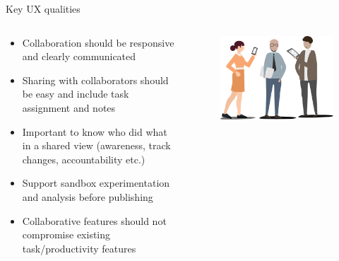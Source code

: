 \documentclass[aspectratio=169]{beamer}
\begin{document}
\begin{frame}{Key UX qualities}
    \begin{columns}
        \begin{column}{0.7\textwidth}
            \small
            \begin{itemize}
                \item Collaboration should be responsive and clearly communicated
                \item Sharing with collaborators should be easy and include task assignment and notes
                \item Important to know who did what in a shared view (awareness, track changes, accountability etc.)
                \item Support sandbox experimentation and analysis before publishing
                \item Collaborative features should not compromise existing task/productivity features
            \end{itemize}
        \end{column}
        \begin{column}{0.4\textwidth}
            \vspace{-2em}
            \begin{figure}[h]
                \centering
                \includegraphics[width=1\textwidth]{images/Users.png}
            \end{figure}
        \end{column}
    \end{columns}
\end{frame}
\end{document}
